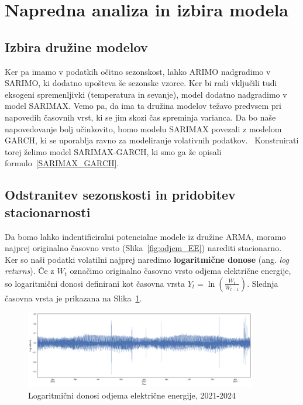 \documentclass[a4paper, 11pt]{article}
\begin{document}


\section{Napredna analiza in izbira modela}

\subsection{Izbira družine modelov}

Ker pa imamo v podatkih očitno sezonskost, lahko ARIMO nadgradimo v SARIMO, ki dodatno
upošteva še sezonske vzorce. Ker bi radi vključili tudi eksogeni spremenljivki (temperatura in sevanje), model
dodatno nadgradimo v model SARIMAX.
Vemo pa, da ima ta družina modelov težavo predvsem pri napovedih časovnih vrst, ki se jim  
skozi čas spreminja varianca. Da bo naše napovedovanje bolj učinkovito, bomo modelu SARIMAX povezali z modelom GARCH, 
ki se uporablja ravno za modeliranje volativnih podatkov.~\cite{ArimaGarch} Konstruirati torej želimo model
SARIMAX-GARCH, ki smo ga že opisali formulo~\eqref{SARIMAX_GARCH}. \\



\subsection{Odstranitev sezonskosti in pridobitev stacionarnosti}

Da bomo lahko indentificiralni potencialne modele iz družine ARMA, moramo najprej originalno časovno vrsto (Slika~\ref{fig:odjem_EE})
narediti stacionarno. \\

\noindent Ker so naši podatki volatilni najprej naredimo \textbf{logaritmične donose} 
(ang. \emph{log returns}). Če z $W_t$ označimo originalno časovno vrsto odjema električne energije, so logaritmični donosi
definirani kot časovna vrsta $ Y_t = \ln \left( \frac{W_t}{W_{t-1}} \right) $. Slednja časovna vrsta je prikazana na
Slika~\ref{fig:log_returns}.

\begin{figure}[h!]
    \centering
    \caption{Logaritmični donosi odjema električne energije, 2021-2024}\par\medskip
    \label{fig:log_returns}
    \includegraphics[width=0.9\textwidth]{log_returns.png}
\end{figure}
\end{document}

